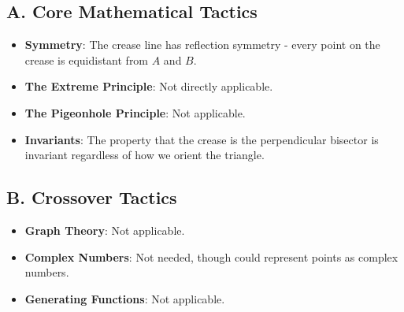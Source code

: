 \documentclass[12pt]{article}
\begin{document}
\begin{tacticalbox}
\subsection*{A. Core Mathematical Tactics}
\begin{itemize}[leftmargin=*]
    \item \textbf{Symmetry}: The crease line has reflection symmetry - every point on the crease is equidistant from $A$ and $B$.
    \item \textbf{The Extreme Principle}: Not directly applicable.
    \item \textbf{The Pigeonhole Principle}: Not applicable.
    \item \textbf{Invariants}: The property that the crease is the perpendicular bisector is invariant regardless of how we orient the triangle.
\end{itemize}

\subsection*{B. Crossover Tactics}
\begin{itemize}[leftmargin=*]
    \item \textbf{Graph Theory}: Not applicable.
    \item \textbf{Complex Numbers}: Not needed, though could represent points as complex numbers.
    \item \textbf{Generating Functions}: Not applicable.
\end{itemize}
\end{tacticalbox}
\end{document}
